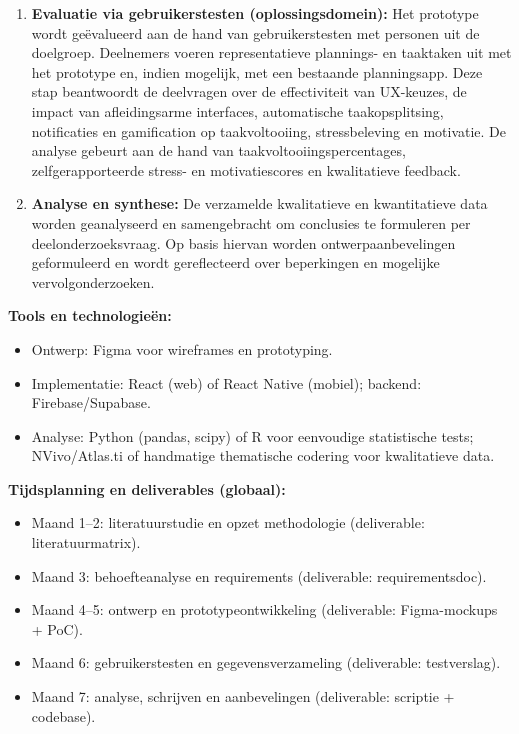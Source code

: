 \begin{enumerate}
  \item \textbf{Evaluatie via gebruikerstesten (oplossingsdomein):}  
  Het prototype wordt geëvalueerd aan de hand van gebruikerstesten met personen uit de doelgroep. Deelnemers voeren representatieve plannings- en taaktaken uit met het prototype en, indien mogelijk, met een bestaande planningsapp.  
  Deze stap beantwoordt de deelvragen over de effectiviteit van UX-keuzes, de impact van afleidingsarme interfaces, automatische taakopsplitsing, notificaties en gamification op taakvoltooiing, stressbeleving en motivatie. De analyse gebeurt aan de hand van taakvoltooiingspercentages, zelfgerapporteerde stress- en motivatiescores en kwalitatieve feedback.

  \item \textbf{Analyse en synthese:}  
  De verzamelde kwalitatieve en kwantitatieve data worden geanalyseerd en samengebracht om conclusies te formuleren per deelonderzoeksvraag. Op basis hiervan worden ontwerpaanbevelingen geformuleerd en wordt gereflecteerd over beperkingen en mogelijke vervolgonderzoeken.
\end{enumerate}

\medskip
\textbf{Tools en technologieën:}
\begin{itemize}
  \item Ontwerp: Figma voor wireframes en prototyping.
  \item Implementatie: React (web) of React Native (mobiel); backend: Firebase/Supabase.
  \item Analyse: Python (pandas, scipy) of R voor eenvoudige statistische tests; NVivo/Atlas.ti of handmatige thematische codering voor kwalitatieve data.
\end{itemize}

\medskip
\textbf{Tijdsplanning en deliverables (globaal):}
\begin{itemize}
  \item Maand 1–2: literatuurstudie en opzet methodologie (deliverable: literatuurmatrix).
  \item Maand 3: behoefteanalyse en requirements (deliverable: requirementsdoc).
  \item Maand 4–5: ontwerp en prototypeontwikkeling (deliverable: Figma-mockups + PoC).
  \item Maand 6: gebruikerstesten en gegevensverzameling (deliverable: testverslag).
  \item Maand 7: analyse, schrijven en aanbevelingen (deliverable: scriptie + codebase).
\end{itemize}

